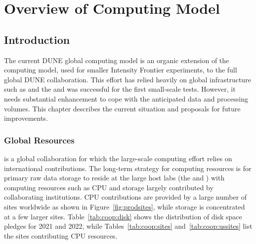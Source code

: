 \documentclass[../main-v1.tex]{subfiles}
\begin{document}
\chapter{Overview of Computing Model }
\label{ch:cm}

\section{Introduction }\label{ch:cm:intro} %






The current DUNE global computing model is an organic extension of the   computing model, used for smaller Intensity Frontier experiments, to the full global DUNE collaboration.  This effort  has relied heavily on global infrastructure such as  and the  and was successful for the first small-scale  tests. However, it needs substantial enhancement to cope with the anticipated data and processing volumes.  This chapter describes the current situation and proposals for future improvements. 

\subsection{Global Resources}

 is a global collaboration %
for which the large-scale computing effort relies on %
international contributions. The long-term strategy for computing resources is for primary raw data storage to reside at the large host labs (the  and ) with computing resources such as %
CPU and storage largely contributed by collaborating %
institutions. CPU contributions are provided by a large number of sites worldwide as shown in Figure~\ref{fig:prodsites}, while storage is concentrated at a few larger %
sites. Table~\ref{tab:coop:disk} shows the distribution of disk space pledges for 2021 and 2022, while Tables~\ref{tab:coop:sites} and~\ref{tab:coop:ussites} list the sites contributing CPU resources. 
\end{document}
